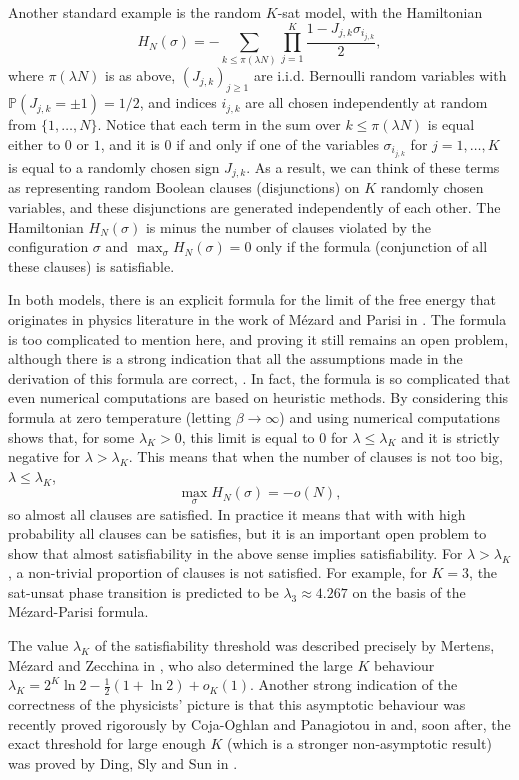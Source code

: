 \documentclass[12pt]{article}
\newcommand{\p}{\mathbb{P}}
\theoremstyle{nonumberplain}
\begin{document}
Another standard example is the random $K$-sat model, with the Hamiltonian 
$$
H_N(\sigma) = - \sum_{k\leq \pi(\lambda N)} \prod_{j=1}^K \frac{1-J_{j,k} \sigma_{i_{j,k}}}{2},
$$
where $\pi(\lambda N)$ is as above, $(J_{j,k})_{j\geq 1}$ are i.i.d. Bernoulli random variables with $\p(J_{j,k}=\pm 1)=1/2$, and indices $i_{j,k}$ are all chosen independently at random from $\{1,\ldots,N\}$. Notice that each term in the sum over $k\leq \pi(\lambda N)$ is equal either to $0$ or $1$, and it is $0$ if and only if one of the variables $\sigma_{i_{j,k}}$ for $j=1,\ldots, K$ is equal to a randomly chosen sign $J_{j,k}.$ As a result, we can think of these terms as representing random Boolean clauses (disjunctions) on $K$ randomly chosen variables, and these disjunctions are generated independently of each other. The Hamiltonian $H_N(\sigma)$ is minus the number of clauses violated by the configuration $\sigma$ and $\max_\sigma H_N(\sigma) = 0$ only if the formula (conjunction of all these clauses) is satisfiable.

In both models, there is an explicit formula for the limit of the free energy  that originates in physics literature in the work of M\'ezard and Parisi in \cite{Mezard}. The formula is too complicated to mention here, and proving it still remains an open problem, although there is a strong indication that all the assumptions made in the derivation of this formula are correct, \cite{AP, Pspins, HEPS, 1RSB, finiteRSB}. In fact, the formula is so complicated that even numerical computations are based on heuristic methods. By considering this formula at zero temperature (letting $\beta\to\infty$) and using numerical computations shows that, for some $\lambda_K>0$, this limit is equal to $0$ for $\lambda\leq \lambda_K$ and it is strictly negative for $\lambda>\lambda_K$. This means that when the number of clauses is not too big, $\lambda\leq \lambda_K$, 
$$
\max_\sigma H_N(\sigma) = - o(N),
$$
so almost all clauses are satisfied. In practice it means that with with high probability all clauses can be satisfies, but it is an important open problem to show that almost satisfiability in the above sense implies satisfiability. For $\lambda >\lambda_K$, a non-trivial proportion of clauses is not satisfied. For example, for $K=3$, the sat-unsat phase transition is predicted to be $\lambda_3 \approx 4.267$ on the basis of the M\'ezard-Parisi formula.  

The value $\lambda_K$ of the satisfiability threshold was described precisely by Mertens, M\'ezard and Zecchina in \cite{MMZ}, who also determined the large $K$ behaviour
$
\lambda_K=2^K \ln 2-\frac{1}{2}(1+\ln 2)+ o_K(1).
$
Another strong indication of the correctness of the physicists' picture is that this asymptotic behaviour was recently proved rigorously by Coja-Oghlan and Panagiotou in \cite{COKSAT} and, soon after, the exact threshold for large enough $K$ (which is a stronger non-asymptotic result) was proved by Ding, Sly and Sun in \cite{DSS}.
\end{document}
